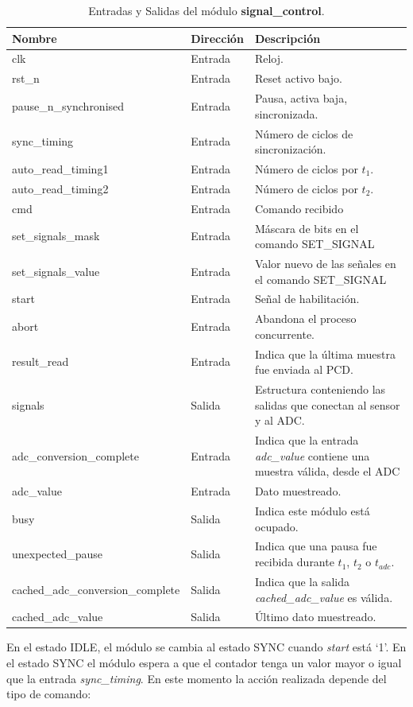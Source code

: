 \documentclass[a4paper, twoside, 11pt]{report}
\begin{document}
\begin{table}[htb]
  \centering
  \tablezebra
  \begin{tabulary}{\linewidth}{l|l|L}
    \setcounter{rownum}{0}
    \textbf{Nombre}&\textbf{Dirección}&\textbf{Descripción} \\
    \hline
    clk&Entrada&Reloj. \\
    rst\_n&Entrada&Reset activo bajo. \\
    pause\_n\_synchronised&Entrada&Pausa, activa baja, sincronizada. \\
    sync\_timing&Entrada&Número de ciclos de sincronización. \\
    auto\_read\_timing1&Entrada&Número de ciclos por $t_1$. \\
    auto\_read\_timing2&Entrada&Número de ciclos por $t_2$. \\
    cmd&Entrada&Comando recibido \\
    set\_signals\_mask&Entrada&Máscara de bits en el comando SET\_SIGNAL \\
    set\_signals\_value&Entrada&Valor nuevo de las señales en el comando SET\_SIGNAL \\
    start&Entrada&Señal de habilitación. \\
    abort&Entrada&Abandona el proceso concurrente. \\
    result\_read&Entrada&Indica que la última muestra fue enviada al PCD. \\
    signals&Salida&Estructura conteniendo las salidas que conectan al sensor y al ADC. \\
    adc\_conversion\_complete&Entrada&Indica que la entrada \textit{adc\_value} contiene una muestra válida, desde el ADC \\
    adc\_value&Entrada&Dato muestreado. \\
    busy&Salida&Indica este módulo está ocupado. \\
    unexpected\_pause&Salida&Indica que una pausa fue recibida durante $t_1$, $t_2$ o $t_{adc}$. \\
    cached\_adc\_conversion\_complete&Salida&Indica que la salida \textit{cached\_adc\_value} es válida. \\
    cached\_adc\_value&Salida&Último dato muestreado. \\
  \end{tabulary}
  \caption{Entradas y Salidas del módulo \textbf{signal\_control}.}
  \label{tab:ports_signal_control}
\end{table}

En el estado IDLE, el módulo se cambia al estado SYNC cuando \textit{start} está ‘1’. En el estado SYNC el módulo espera a que el contador tenga un valor mayor o igual que la entrada \textit{sync\_timing}. En este momento la acción realizada depende del tipo de comando:
\end{document}
